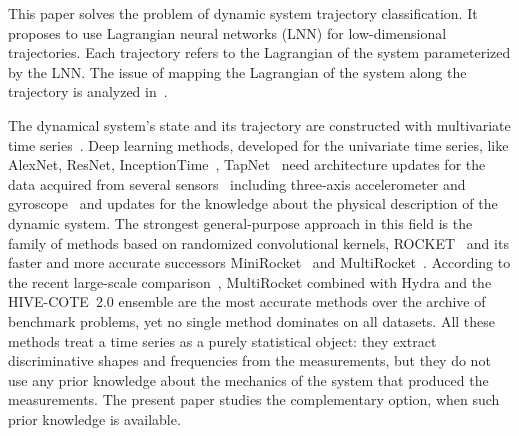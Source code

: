 \documentclass[sn-mathphys-num]{sn-jnl}
\theoremstyle{thmstylethree}
\theoremstyle{thmstyletwo}
\theoremstyle{thmstyleone}
\begin{document}
This paper solves the problem of dynamic system trajectory classification. It proposes to use Lagrangian neural networks (LNN) for low-dimensional trajectories. Each trajectory refers to the Lagrangian of the system parameterized by the LNN. The issue of mapping the Lagrangian of the system along the trajectory is analyzed in~\cite{article}.

The dynamical system's state and its trajectory are constructed with multivariate time series~\cite{TCSreview}. Deep learning methods, developed for the univariate time series, like AlexNet, ResNet, InceptionTime~\cite{InceptionTime}, TapNet~\cite{TCSreview,MTCSreview} need architecture updates for the data acquired from several sensors~\cite{MTCSindustrial} including three-axis accelerometer and gyroscope~\cite{MTCSactivity} and updates for the knowledge about the physical description of the dynamic system. The strongest general-purpose approach in this field is the family of methods based on randomized convolutional kernels, ROCKET~\cite{ROCKET} and its faster and more accurate successors MiniRocket~\cite{MiniRocket} and MultiRocket~\cite{MultiRocket}. According to the recent large-scale comparison~\cite{BakeOffRedux}, MultiRocket combined with Hydra and the HIVE-COTE~2.0 ensemble are the most accurate methods over the archive of benchmark problems, yet no single method dominates on all datasets. All these methods treat a time series as a purely statistical object: they extract discriminative shapes and frequencies from the measurements, but they do not use any prior knowledge about the mechanics of the system that produced the measurements. The present paper studies the complementary option, when such prior knowledge is available.
\end{document}

